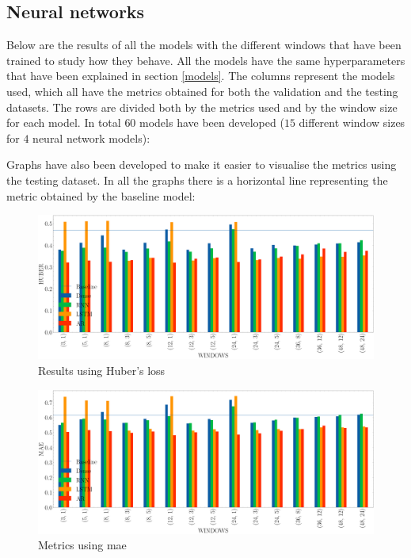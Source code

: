 \subsection{Neural networks}


Below are the results of all the models with the different windows that have been trained to study how they behave. All the models have the same hyperparameters that have been explained in section \ref{models}. The columns represent the models used, which all have the metrics obtained for both the validation and the testing datasets. The rows are divided both by the metrics used and by the window size for each model. In total $60$ models have been developed ($15$ different window sizes for $4$ neural network models):



Graphs have also been developed to make it easier to visualise the metrics using the testing dataset. In all the graphs there is a horizontal line representing the metric obtained by the baseline model:



\begin{figure}[H]
    \centering
    \includegraphics[width=15cm]{images/solution/metrics/HUBER.png}
    \caption{Results using Huber's loss}
\end{figure}

\begin{figure}[H]
    \centering
    \includegraphics[width=15cm]{images/solution/metrics/MAE.png}
    \caption{Metrics using \acrshort{mae}}
\end{figure}

